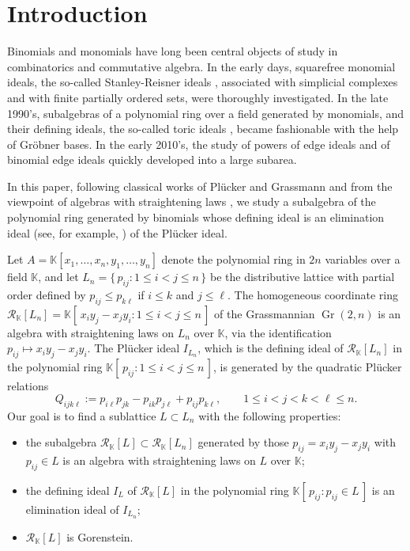 \documentclass[12pt,a4paper]{amsart}
\def\Rc{{\mathcal R}}
\DeclareMathOperator{\Gr}{Gr}
\theoremstyle{definition}
\begin{document}
\section*{Introduction}
Binomials and monomials have long been central objects of study in combinatorics and commutative algebra.  In the early days, squarefree monomial ideals, the so-called Stanley-Reisner ideals \cite{Reisner76, Stanley75}, associated with simplicial complexes and with finite partially ordered sets, were thoroughly investigated. In the late 1990's, subalgebras of a polynomial ring over a field generated by monomials, and their defining ideals, the so-called toric ideals \cite{OH99, Sturmfels96}, became fashionable with the help of Gr\"obner bases.  %
In the early 2010's, the study of powers of edge ideals and of binomial edge ideals \cite{HHZ04, H+10} quickly developed into a large subarea.

In this paper, following classical works of Pl\"ucker \cite{Pluecker1, Pluecker2} and Grassmann \cite{Grassmann} and from the viewpoint of algebras with straightening laws \cite{Eisenbud80}, we study a subalgebra of the polynomial ring generated by binomials whose defining ideal is an elimination ideal (see, for example, \cite[Theorem 1.4.1]{GB2013}) of the Pl\"ucker ideal.

\smallskip

Let $A=\mathbb{K}[x_1,\ldots,x_n,y_1,\ldots,y_n]$ denote the polynomial ring in $2n$ variables over a field $\mathbb{K}$, and let
$L_n=\{\,p_{ij}: 1\le i<j\le n\,\}$ be the distributive lattice with partial order defined by $p_{ij}\le p_{k\ell}$ if $i\le k$ and $j\le \ell$. The homogeneous coordinate ring
$\Rc_{\mathbb{K}}[L_n]=\mathbb{K}[\,x_i y_j - x_j y_i: 1\le i<j\le n\,]$
of the Grassmannian $\Gr(2,n)$ is an algebra with straightening laws on $L_n$ over $\mathbb{K}$, via the identification $p_{ij}\mapsto x_i y_j - x_j y_i$. The Pl\"ucker ideal $I_{L_n}$, which is the defining ideal of $\Rc_{\mathbb{K}}[L_n]$ in the polynomial ring $\mathbb{K}[\,p_{ij}: 1\le i<j\le n\,]$, is generated by the quadratic Pl\"ucker relations
\begin{equation}\label{eq: Plucker_relations intro}
    Q_{ijk\ell}:=p_{i\ell}p_{jk}-p_{ik}p_{j\ell}+p_{ij}p_{k\ell}, 
\qquad 1\le i<j<k<\ell\le n.
\end{equation}
Our goal is to find a sublattice $L\subset L_n$ with the following properties:
\begin{itemize}
    \item[(i)] the subalgebra $\Rc_{\mathbb{K}}[L]\subset \Rc_{\mathbb{K}}[L_n]$ generated by those $p_{ij}=x_i y_j - x_j y_i$ with $p_{ij}\in L$ is an algebra with straightening laws on $L$ over $\mathbb{K}$;
\item[(ii)] the defining ideal $I_L$ of $\Rc_{\mathbb{K}}[L]$ in the polynomial ring $\mathbb{K}[\,p_{ij}: p_{ij}\in L\,]$ is an elimination ideal of $I_{L_n}$;
\item[(iii)] $\Rc_{\mathbb{K}}[L]$ is Gorenstein.
\end{itemize}
\end{document}
